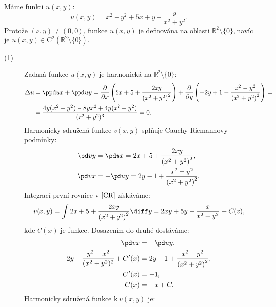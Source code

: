 \documentclass[10pt,a4paper]{article}
\begin{document}
Máme funkci $u(x,y)$:
\begin{equation}
\boxed{
u(x,y) = x^2-y^2+5x+y-\frac{y}{x^2+y^2}.
}
\end{equation}
Protože $(x,y) \neq (0,0)$, funkce $u(x,y)$ je definována na oblasti $\mathbb{R}^{2}\setminus\lbrace 0\rbrace$, navíc je $u(x,y) \in \mathrm{C}^{2}(\mathbb{R}^{2}\setminus\lbrace 0\rbrace)$.
\begin{description}
\item[(1)] Zadaná funkce $u(x,y)$ je harmonická na $\mathbb{R}^{2}\setminus\lbrace 0\rbrace$:
\begin{equation}
\begin{split}
\Delta u &= \ppd u x + \ppd u y  =  \frac{\partial}{\partial x} \left( 2 x+5 +\frac{2 x y}{\left(x^{2}+y^{2}\right)^{2}} \right) +
\frac{\partial}{\partial y} \left( -2y+1-\frac{x^{2}-y^{2}}{\left(x^{2}+y^{2} \right)^{2}}\right) =\\
 & = \dfrac{4y(x^{2}+y^{2})-8yx^{2}+4y(x^{2}-y^{2})}{(x^{2}+y^{2})^{3}} =0. \\
\end{split}
\end{equation}
Harmonicky sdružená funkce $v(x,y)$ splňuje Cauchy-Riemannovy podmínky:
\begin{equation}
\label{CR}
\begin{split}
\pd v y & = \pd u x =  2 x+5 +\frac{2 x y}{\left(x^{2}+y^{2}\right)^{2}} ,\\
\pd v x & = -\pd u y = 2y-1+\frac{x^{2}-y^{2}}{\left(x^{2}+y^{2} \right)^{2}} .\\
\end{split}
\end{equation}
Integrací první rovnice v $\eqref{CR}$ získáváme:
\begin{equation}
v(x,y)= \int 2 x+5 +\frac{2 x y}{\left(x^{2}+y^{2}\right)^{2}} \diff y = 2xy+5y-\dfrac{x}{x^{2}+y^{2}}+C(x),
\end{equation}
kde $C(x)$ je funkce. Dosazením do druhé dostáváme:
\begin{equation}
\begin{split}
\pd v x & = -\pd u y  ,\\
2y -\dfrac{y^{2}-x^{2}}{(x^{2}+y^{2})^{2}} +C'(x)& = 2y-1+\frac{x^{2}-y^{2}}{\left(x^{2}+y^{2} \right)^{2}} ,\\
C'(x) & = -1 ,\\
C(x) & = -x+C .\\
\end{split}
\end{equation}
Harmonicky sdružená funkce k $v(x,y)$ je:

\end{description}
\end{document}
